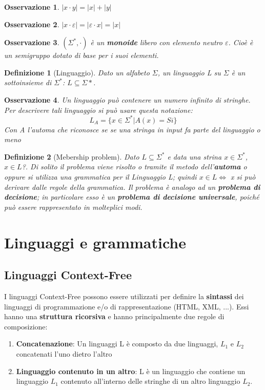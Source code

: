 \documentclass[12pt]{article}
\newtheorem{Definizione}{Definizione}[subsection]
\newtheorem{Osservazione}{Osservazione}[subsection]
\begin{document}
\begin{Osservazione}
    $|x \cdot y| = |x| + |y|$
\end{Osservazione}
\begin{Osservazione}
    $|x \cdot \varepsilon| = |\varepsilon \cdot x| = |x|$
\end{Osservazione}
\begin{Osservazione}
    $(\Sigma^*, \cdot)$ è un \textbf{monoide} libero con elemento neutro $\varepsilon$. Cioè è un semigruppo dotato di base per i suoi elementi.
\end{Osservazione}
\begin{Definizione}[Linguaggio]
Dato un alfabeto $\Sigma$, un linguaggio L su $\Sigma$ è un sottoinsieme di $\Sigma^*$: $L \subseteq \Sigma*$.
\end{Definizione}
\begin{Osservazione}
    Un linguaggio può contenere un numero infinito di stringhe. Per descrivere tali linguaggio si può usare questa notazione: $$L_A = \{x \in \Sigma^* | A(x) = Si\}$$
    Con A l'automa che riconosce se se una stringa in input fa parte del linguaggio o meno
\end{Osservazione}
\newpage
\begin{Definizione}[Mebership problem]
Dato $L \subseteq \Sigma^*$ e data una strina $x \in \Sigma^*$, $x \in L$?. Di solito il problema viene risolto o tramite il metodo dell'\textbf{automa} o oppure si utilizza una grammatica per il Linguaggio L; quindi $x \in L \Leftrightarrow$ x si può derivare dalle regole della grammatica. Il problema è analogo ad un \textbf{problema di decisione}; in particolare esso è un \textbf{problema di decisione universale}, poiché può essere rappresentato in molteplici modi.
\end{Definizione}
\section{Linguaggi e grammatiche}
\subsection{Linguaggi Context-Free}
I linguaggi Context-Free possono essere utilizzati per definire la \textbf{sintassi} dei linguaggi di programmazione e/o di rappresentazione (HTML, XML, ...). Essi hanno una \textbf{struttura ricorsiva} e hanno principalmente due regole di composizione:
\begin{enumerate}
    \item \textbf{Concatenazione}: Un linguaggi L è composto da due linguaggi, $L_1$ e $L_2$ concatenati l'uno dietro l'altro
    \item \textbf{Linguaggio contenuto in un altro}: L è un linguaggio che contiene un linguaggio $L_1$ contenuto all'interno delle stringhe di un altro linguaggio $L_2$.
\end{enumerate}
\end{document}
